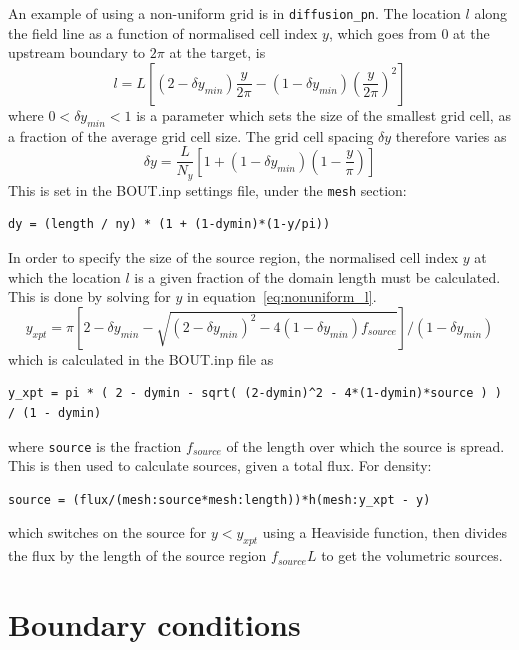 \documentclass[12pt,a4paper]{article}
\begin{document}
An example of using a non-uniform grid is in \texttt{diffusion\_pn}.
The location $l$ along the field line as a function of normalised cell index $y$,
which goes from $0$ at the upstream boundary to $2\pi$ at the target, is
\begin{equation}
  l = L\left[ \left(2 - \delta y_{min}\right)\frac{y}{2\pi} -\left(1-\delta y_{min}\right)\left(\frac{y}{2\pi}\right)^2\right]
\label{eq:nonuniform_l}
\end{equation}
where $0<\delta y_{min}<1$ is a parameter which sets the size of the smallest grid cell, as a fraction
of the average grid cell size. The grid cell spacing $\delta y$ therefore varies as 
\begin{equation}
\delta y = \frac{L}{N_y} \left[ 1 + \left(1-\delta y_{min}\right)\left(1-\frac{y}{\pi}\right)\right]
\end{equation}
This is set in the BOUT.inp settings file, under the \texttt{mesh} section:
\begin{verbatim}
dy = (length / ny) * (1 + (1-dymin)*(1-y/pi))
\end{verbatim}
In order to specify the size of the source region, the normalised cell index $y$ at which
the location $l$ is a given fraction of the domain length must be calculated. This is done by
solving for $y$ in equation~\ref{eq:nonuniform_l}.
\begin{equation}
y_{xpt} = \pi\left[2 - \delta y_{min} - \sqrt{\left(2-\delta y_{min}\right)^2 - 4\left(1-\delta y_{min}\right) f_{source}}\right]/\left(1-\delta y_{min}\right)
\end{equation}
which is calculated in the BOUT.inp file as
\begin{verbatim}
y_xpt = pi * ( 2 - dymin - sqrt( (2-dymin)^2 - 4*(1-dymin)*source ) ) / (1 - dymin)
\end{verbatim}
where \texttt{source} is the fraction $f_{source}$ of the length over which the source is spread.
This is then used to calculate sources, given a total flux. For density:
\begin{verbatim}
source = (flux/(mesh:source*mesh:length))*h(mesh:y_xpt - y)
\end{verbatim}
which switches on the source for $y < y_{xpt}$ using a Heaviside function, then divides the flux
by the length of the source region $f_{source}L$ to get the volumetric sources.

\section{Boundary conditions}
\end{document}
